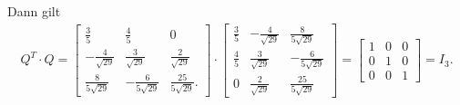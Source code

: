\documentclass[fleqn,draft,a5paper]{article}
\theoremstyle{remark}
\begin{document}
  Dann gilt
  \begin{multline*}
    Q^{T} \cdot Q =     \begin{bmatrix}
      \frac35 & \frac45 & 0 \\
      -\frac{4}{\sqrt{29}} & \frac{3}{\sqrt{29}} & \frac{2}{\sqrt{29}}
      \\
      \frac{8}{5\sqrt{29}} & -\frac{6}{5\sqrt{29}} & \frac{25}{5\sqrt{29}}.
    \end{bmatrix} \cdot     \begin{bmatrix}
      \frac35 & - \frac{4}{\sqrt{29}} & \frac{8}{5\sqrt{29}} \\
      \frac45 & \frac{3}{\sqrt{29}} & - \frac{6}{5\sqrt{29}} \\
      0 & \frac{2}{\sqrt{29}} & \frac{25}{5\sqrt{29}}
    \end{bmatrix}
    =
    \begin{bmatrix}
      1 & 0 & 0 \\ 0 & 1 & 0 \\ 0 & 0 & 1
    \end{bmatrix}
    = I_{3}.
  \end{multline*}
\end{document}
